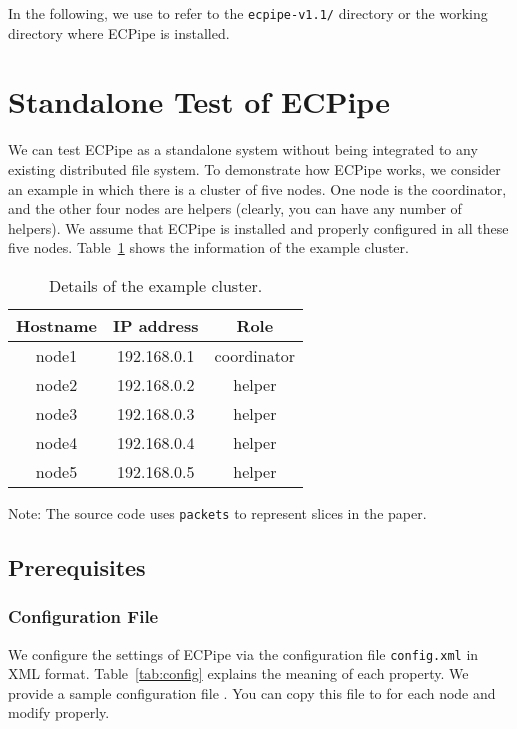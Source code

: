 \documentclass[letterpaper,12pt]{article}
\newcommand{\sysname}{{\sf\small ECPipe}\xspace}
\begin{document}
In the following, we use  to refer to the {\tt ecpipe-v1.1/}
directory or the working directory where ECPipe is installed.

\section{Standalone Test of ECPipe}

We can test \sysname as a standalone system without being integrated to any
existing distributed file system.  To demonstrate how \sysname works, we
consider an example in which there is a cluster of five nodes.  One node is
the coordinator, and the other four nodes are helpers (clearly, you can have
any number of helpers).  We assume that \sysname is installed and properly configured in
all these five nodes.  Table~\ref{tab:cluster} shows the information of the
example cluster.

\begin{table}[!h]
\centering
\begin{tabular}{|c|c|c|}
\hline
{\bf Hostname} & {\bf IP address} & {\bf Role} \\
\hline
node1 & 192.168.0.1 & coordinator \\
\hline
node2 & 192.168.0.2 & helper \\
\hline
node3 & 192.168.0.3 & helper \\
\hline
node4 & 192.168.0.4 & helper \\
\hline
node5 & 192.168.0.5 & helper \\
\hline
\end{tabular}
\caption{Details of the example cluster.}
\label{tab:cluster}
\end{table}

Note: The source code uses {\tt packets} to represent slices in the paper.

\subsection{Prerequisites}
\label{subsec:pre}

\subsubsection{Configuration File}

We configure the settings of \sysname via the configuration file
{\tt config.xml} in XML format.  Table~\ref{tab:config} explains the meaning
of each property.  We provide a sample configuration file
.  You can copy this file to
 for each node and modify properly.
\end{document}
